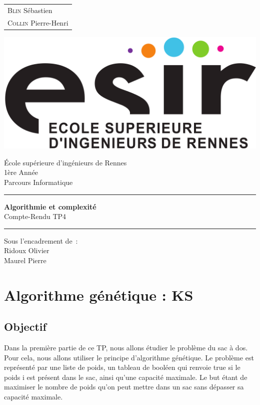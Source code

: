 \documentclass{article}
\begin{document}
\begin{titlepage}
	\vspace{-20px}
	\begin{tabular}{l}
		\textsc{Blin} S\'ebastien\\
		\textsc{Collin} Pierre-Henri
	\end{tabular}
	\hfill \vspace{10px}\includegraphics[scale=0.1]{esir.png}\\
	\vfill
	\begin{center}
		\Huge{\'Ecole sup\'erieure d'ing\'enieurs de Rennes}\\
		\vspace{1cm}
		\LARGE{1\`ere Ann\'ee}\\
		\large{Parcours Informatique}\\
		\vspace{0.5cm}\hrule\vspace{0.5cm}
		\LARGE{\textbf{Algorithmie et complexité}}\\
		\Large{Compte-Rendu TP4}
		\vspace{0.5cm}\hrule
		\vfill
		\vfill
	\end{center}
	\begin{flushleft}
		\Large{Sous l'encadrement de~:}\\
		\vspace{0.2cm}
		\large{{Ridoux} Olivier}\\
		\large{{Maurel} Pierre}
	\end{flushleft}
	\vfill
\end{titlepage}

\section{Algorithme génétique : KS}
\subsection{Objectif}
Dans la première partie de ce TP, nous allons étudier le problème du sac à dos. Pour cela, nous allons utiliser le principe d'algorithme génétique. Le problème est représenté par une liste de poids, un tableau de booléen qui renvoie true si le poids i est présent dans le sac, ainsi qu'une capacité maximale. Le but étant de maximiser le nombre de poids qu'on peut mettre dans un sac sans dépasser sa capacité maximale.
\end{document}
